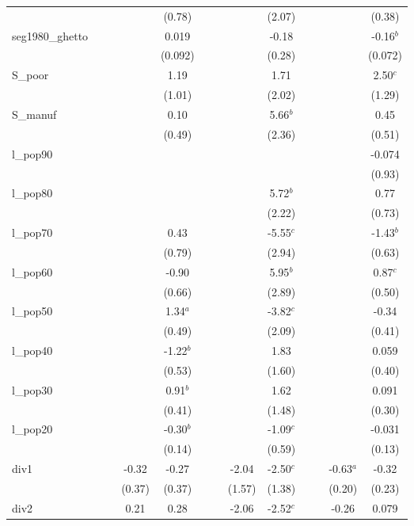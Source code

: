 \documentclass[]{article}
\begin{document}
\begin{tabular}{lcccccccccccc}
 &  &  &  & (0.78) &  &  &  & (2.07) &  &  &  & (0.38) \\
seg1980\_ghetto &  &  &  & 0.019 &  &  &  & -0.18 &  &  &  & -0.16$^b$ \\
 &  &  &  & (0.092) &  &  &  & (0.28) &  &  &  & (0.072) \\
S\_poor &  &  &  & 1.19 &  &  &  & 1.71 &  &  &  & 2.50$^c$ \\
 &  &  &  & (1.01) &  &  &  & (2.02) &  &  &  & (1.29) \\
S\_manuf &  &  &  & 0.10 &  &  &  & 5.66$^b$ &  &  &  & 0.45 \\
 &  &  &  & (0.49) &  &  &  & (2.36) &  &  &  & (0.51) \\
l\_pop90 &  &  &  &  &  &  &  &  &  &  &  & -0.074 \\
 &  &  &  &  &  &  &  &  &  &  &  & (0.93) \\
l\_pop80 &  &  &  &  &  &  &  & 5.72$^b$ &  &  &  & 0.77 \\
 &  &  &  &  &  &  &  & (2.22) &  &  &  & (0.73) \\
l\_pop70 &  &  &  & 0.43 &  &  &  & -5.55$^c$ &  &  &  & -1.43$^b$ \\
 &  &  &  & (0.79) &  &  &  & (2.94) &  &  &  & (0.63) \\
l\_pop60 &  &  &  & -0.90 &  &  &  & 5.95$^b$ &  &  &  & 0.87$^c$ \\
 &  &  &  & (0.66) &  &  &  & (2.89) &  &  &  & (0.50) \\
l\_pop50 &  &  &  & 1.34$^a$ &  &  &  & -3.82$^c$ &  &  &  & -0.34 \\
 &  &  &  & (0.49) &  &  &  & (2.09) &  &  &  & (0.41) \\
l\_pop40 &  &  &  & -1.22$^b$ &  &  &  & 1.83 &  &  &  & 0.059 \\
 &  &  &  & (0.53) &  &  &  & (1.60) &  &  &  & (0.40) \\
l\_pop30 &  &  &  & 0.91$^b$ &  &  &  & 1.62 &  &  &  & 0.091 \\
 &  &  &  & (0.41) &  &  &  & (1.48) &  &  &  & (0.30) \\
l\_pop20 &  &  &  & -0.30$^b$ &  &  &  & -1.09$^c$ &  &  &  & -0.031 \\
 &  &  &  & (0.14) &  &  &  & (0.59) &  &  &  & (0.13) \\
div1 &  &  & -0.32 & -0.27 &  &  & -2.04 & -2.50$^c$ &  &  & -0.63$^a$ & -0.32 \\
 &  &  & (0.37) & (0.37) &  &  & (1.57) & (1.38) &  &  & (0.20) & (0.23) \\
div2 &  &  & 0.21 & 0.28 &  &  & -2.06 & -2.52$^c$ &  &  & -0.26 & 0.079 \\

\end{tabular}
\end{document}
